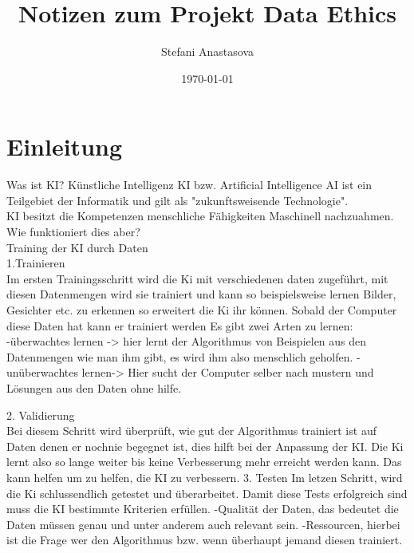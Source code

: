 \documentclass{article}
\title{Notizen zum Projekt Data Ethics}
\author{Stefani Anastasova}
\date{\today}
\begin{document}
\maketitle




\tableofcontents

\section{Einleitung}
Was ist KI?
Künstliche Intelligenz KI bzw. Artificial Intelligence AI ist ein Teilgebiet der Informatik und gilt als "zukunftsweisende Technologie". \\
KI besitzt die Kompetenzen menschliche Fähigkeiten Maschinell nachzuahmen.
Wie funktioniert dies aber? \\
    Training der KI durch Daten\\ 
    1.Trainieren\\
    Im ersten Trainingsschritt wird die Ki mit verschiedenen daten zugeführt, mit diesen Datenmengen wird sie trainiert und kann so beispielsweise lernen Bilder, Gesichter etc. zu erkennen
    so erweitert die Ki ihr können. Sobald der Computer diese Daten hat kann er trainiert werden 
    Es gibt zwei Arten zu lernen:  
    -überwachtes lernen -> hier lernt der Algorithmus von Beispielen aus den Datenmengen wie man ihm gibt, es wird ihm also menschlich geholfen.
    -unüberwachtes lernen-> Hier sucht der Computer selber nach mustern und Lösungen aus den Daten ohne hilfe.

    2. Validierung\\
    Bei diesem Schritt wird überprüft, wie gut der Algorithmus trainiert ist auf Daten denen er nochnie begegnet ist, dies hilft bei der Anpassung der KI. 
    Die Ki lernt also so lange weiter bis keine Verbesserung mehr erreicht werden kann. 
    Das kann helfen um zu helfen, die KI zu verbessern.
    3. Testen
    Im letzen Schritt, wird die Ki schlussendlich getestet und überarbeitet. Damit diese Tests erfolgreich sind muss die KI bestimmte Kriterien erfüllen.
    -Qualität der Daten, das bedeutet die Daten müssen genau und unter anderem auch relevant sein.
    -Ressourcen, hierbei ist die Frage wer den Algorithmus bzw. wenn überhaupt jemand diesen trainiert. 
\\
\\
\end{document}
